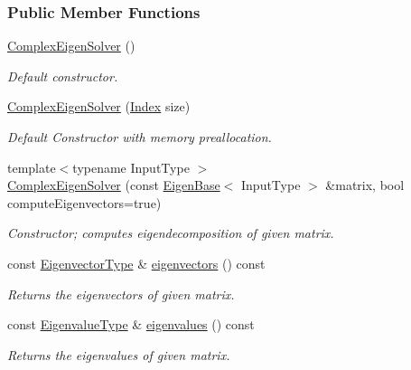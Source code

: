 \subsubsection*{Public Member Functions}
\begin{DoxyCompactItemize}
\item 
\hyperlink{group___eigenvalues___module_a3322a21574c61eefd450c003515ad802}{Complex\+Eigen\+Solver} ()
\begin{DoxyCompactList}\small\item\em Default constructor. \end{DoxyCompactList}\item 
\hyperlink{group___eigenvalues___module_a86751f64ebcd5c554551fb5eaaa02db7}{Complex\+Eigen\+Solver} (\hyperlink{group___eigenvalues___module_abc0218d8b902af0d6c759bfc0a8a8d74}{Index} size)
\begin{DoxyCompactList}\small\item\em Default Constructor with memory preallocation. \end{DoxyCompactList}\item 
{\footnotesize template$<$typename Input\+Type $>$ }\\\hyperlink{group___eigenvalues___module_a748de5c1e7f730e16421e6d451437600}{Complex\+Eigen\+Solver} (const \hyperlink{group___core___module_struct_eigen_1_1_eigen_base}{Eigen\+Base}$<$ Input\+Type $>$ \&matrix, bool compute\+Eigenvectors=true)
\begin{DoxyCompactList}\small\item\em Constructor; computes eigendecomposition of given matrix. \end{DoxyCompactList}\item 
const \hyperlink{group___eigenvalues___module_a67cd4d20590abfd86b2639c4c8ea3dd6}{Eigenvector\+Type} \& \hyperlink{group___eigenvalues___module_a3aa5e27800349990778da8fa532c1270}{eigenvectors} () const
\begin{DoxyCompactList}\small\item\em Returns the eigenvectors of given matrix. \end{DoxyCompactList}\item 
const \hyperlink{group___eigenvalues___module_ad3a663b1ff5200a098dabbbf9b7162b1}{Eigenvalue\+Type} \& \hyperlink{group___eigenvalues___module_a10c25c7620e7faedcd39991cce3a757b}{eigenvalues} () const
\begin{DoxyCompactList}\small\item\em Returns the eigenvalues of given matrix. \end{DoxyCompactList}\item 

\end{DoxyCompactItemize}
